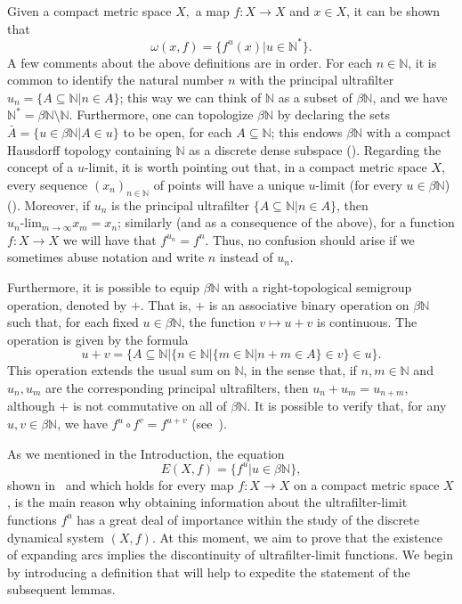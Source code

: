 \documentclass[12pt]{amsart}
\theoremstyle{definition}
\numberwithin{equation}{section}
\begin{document}
Given a compact metric space $X,$ a map $f \colon X\longrightarrow X$ and $x \in X$, 
it can be shown that 
$$
\omega(x,f)=\{f^u(x)\big|u\in\mathbb N^*\}.
$$
A few comments about the above definitions are in order. For each $n\in\mathbb N$, it is common to identify the natural number $n$ with the principal ultrafilter $u_n=\{A\subseteq\mathbb N\big|n\in A\}$; this way we can think 
of $\mathbb N$ as a subset of $\beta\mathbb N$, and we have $\mathbb N^*=\beta\mathbb N\setminus\mathbb N$. Furthermore, one can topologize $\beta\mathbb N$ by declaring the sets 
$\bar{A}=\{u\in \beta \mathbb N\big|A\in u\}$ to be open, for each $A\subseteq \mathbb N$; this endows 
$\beta\mathbb N$ with a compact Hausdorff topology containing $\mathbb N$ as a discrete dense subspace (\cite[Lemma~3.17 and Theorems~3.18 and 3.28]{hindman-strauss}). Regarding the concept of a 
$u$-limit, it is worth pointing out that, in a compact metric space $X$, every sequence $(x_n)_{n\in\mathbb N}$ of points will have a unique $u$-limit (for every $u\in\beta\mathbb N$)(\cite[Theorem~3.48]{hindman-strauss}). Moreover, if $u_n$ is the principal ultrafilter $\{A\subseteq\mathbb N\big|n\in A\}$, then 
$u_n\text{-lim}_{m\to\infty}x_m=x_n$; similarly (and as a consequence of the above), for a function 
$f \colon X\longrightarrow X$ we will have that $f^{u_n}=f^n$. Thus, no confusion should arise if we sometimes 
abuse notation and write $n$ instead of $u_n$.

Furthermore, it is possible to equip $\beta\mathbb N$ with a right-topological semigroup operation, denoted by 
$+$. That is, $+$ is an associative binary operation on $\beta\mathbb N$ such that, for each fixed 
$u\in \beta \mathbb N$, the function $v\longmapsto u+v$ is continuous. The operation is given by the formula
\begin{equation*}
u+v=\{A\subseteq\mathbb N\big|\{n\in\mathbb N\big|\{m\in\mathbb N\big|n+m\in A\}\in v\}\in u\}.
\end{equation*}
This operation extends the usual sum on $\mathbb N$, in the sense that, if $n,m\in\mathbb N$ and $u_n,u_m$ are the corresponding principal ultrafilters, then $u_n+u_m=u_{n+m}$, although $+$ is not commutative on all of $\beta\mathbb N$. It is possible to verify that, for any $u,v\in\beta\mathbb N$, we have $f^u\circ f^v=f^{u+v}$ 
(see~\cite[p. 38]{blass-ultra-dynamics}).

As we mentioned in the Introduction, the equation 
$$
E(X,f)=\{f^u\big|u\in\beta\mathbb N\},
$$
\noindent shown in~\cite[Theorem~2.2]{garcia-sanchis} and which holds for every map 
$f \colon X\longrightarrow X$ on a compact metric space $X$, is the main reason why obtaining information about 
the ultrafilter-limit functions $f^u$ has a great deal of importance within the study of the discrete dynamical system $(X,f)$. 
At this moment, we aim to prove that the existence of expanding arcs implies the discontinuity of ultrafilter-limit functions. We begin by introducing a definition that will help to expedite the statement of the subsequent lemmas.
\end{document}
